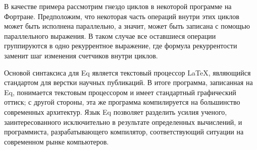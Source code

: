 \documentclass[a4paper]{llncs}
\begin{document}
В качестве примера рассмотрим гнездо циклов в некоторой программе на Фортране. Предположим, что некоторая часть операций внутри этих циклов может быть исполнена параллельно, а значит, может быть записана с помощью параллельного выражения. В таком случае все оставшиеся операции группируются в одно рекуррентное выражение, где формула рекуррентости заменит шаг изменения счетчиков внутри циклов.

Основой синтаксиса для Eq является текстовый процессор \LaTeX, являющийся стандартом для верстки научных публикаций. В итоге программа, записанная на Eq, понимается текстовым процессором и имеет стандартный графический оттиск; с другой стороны, эта же программа компилируется на большинство современных архитектур. Язык Eq позволяет разделить усилия ученого, заинтересованного исключительно в результате определенных вычислений, и программиста, разрабатывающего компилятор, соответствующий ситуации на современном рынке компьютеров.
\end{document}
